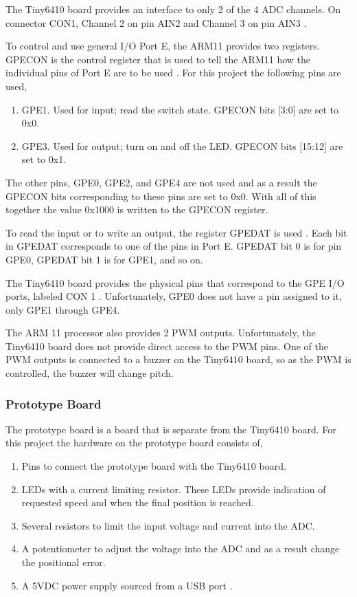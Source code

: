 \documentclass[10pt,conference]{IEEEtran}
\begin{document}
The Tiny6410 board provides an interface to only 2 of the 4 ADC channels. On connector CON1, Channel 2 on pin AIN2 and Channel 3 on pin AIN3 \cite{HWHandout}.

To control and use general I/O Port E, the ARM11 provides two registers. GPECON is the control register that is used to tell the ARM11 how the individual pins of Port E are to be used \cite{Samsung}. For this project the following pins are used,
\begin{enumerate}
	\item GPE1. Used for input; read the switch state. GPECON bits [3:0] are set to 0x0.
	\item GPE3. Used for output; turn on and off the LED. GPECON bits [15:12] are set to 0x1.
\end{enumerate}
The other pins, GPE0, GPE2, and GPE4 are not used and as a result the GPECON bits corresponding to these pins are set to 0x0. With all of this together the value 0x1000 is written to the GPECON register.

To read the input or to write an output, the register GPEDAT is used \cite{Samsung}.  Each bit in GPEDAT corresponds to one of the pins in Port E.  GPEDAT bit 0 is for pin GPE0, GPEDAT bit 1 is for GPE1, and so on. 

The Tiny6410 board provides the physical pins that correspond to the GPE I/O ports, labeled CON 1 \cite{HWHandout}. Unfortunately, GPE0 does not have a pin assigned to it, only GPE1 through GPE4.

The ARM 11 processor also provides 2 PWM outputs. Unfortunately, the Tiny6410 board does not provide direct access to the PWM pins. One of the PWM outputs is connected to a buzzer on the Tiny6410 board, so as the PWM is controlled, the buzzer will change pitch.

\subsubsection{Prototype Board}\label{ProtoBoard}
The prototype board is a board that is separate from the Tiny6410 board. For this project the hardware on the prototype board consists of,
\begin{enumerate}
	\item Pins to connect the prototype board with the Tiny6410 board.
	\item LEDs with a current limiting resistor.  These LEDs provide indication of requested speed and when the final position is reached.
	\item Several resistors to limit the input voltage and current into the ADC.
	\item A potentiometer to adjust the voltage into the ADC and as a result change the positional error.
	\item A 5VDC power supply sourced from a USB port \cite{USB5VDC}.
\end{enumerate}
\end{document}
